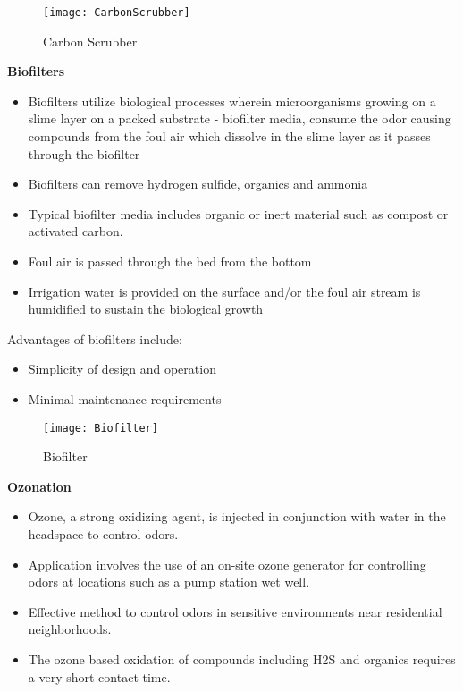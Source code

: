 \begin{figure}[htp]
	\begin{center}
		\texttt{[image: CarbonScrubber]}
			\caption{Carbon Scrubber}
	\end{center}
	
	\end{figure}

\textbf{Biofilters}
\begin{itemize}
\item Biofilters utilize biological processes wherein microorganisms growing on a slime layer on a packed substrate - biofilter media, consume the odor causing compounds from the foul air which dissolve in the slime layer as it passes through the biofilter
\item Biofilters can remove hydrogen sulfide, organics and ammonia
\item Typical biofilter media includes organic or inert material such as compost or activated carbon.
\item Foul air is passed through the bed from the bottom
\item Irrigation water is provided on the surface and/or the foul air stream is humidified to sustain the biological growth
\end{itemize}
Advantages of biofilters include:
\begin{itemize}
\item Simplicity of design and operation
\item Minimal maintenance requirements
\end{itemize}


\begin{figure}
	\begin{center}
		\texttt{[image: Biofilter]}
			\caption{Biofilter}
	\end{center}
	
	\end{figure}
	
\textbf{Ozonation}
\begin{itemize}
\item Ozone, a strong oxidizing agent, is injected in conjunction with water in the headspace to control odors.
\item Application involves the use of an on-site ozone generator for controlling odors at locations such as a pump station wet well.
\item Effective method to control odors in sensitive environments near residential neighborhoods.
\item The ozone based oxidation of compounds including H2S and organics requires a very short contact time.
\end{itemize}


